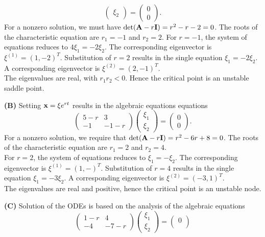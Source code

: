 \documentclass[11pt,a4paper]{article}
\begin{document}
\begin{enumerate}
$$\begin{pmatrix}
			\xi_2
		\end{pmatrix} = 
		\begin{pmatrix}
			0\\
			0
		\end{pmatrix}.
		$$
		For a nonzero solution, we must have $\det(\vb{A} - r\vb{I}) = r^2 - r - 2 = 0$. The roots of the characteristic equation are $r_1 = -1$ and $r_2 = 2$. For $r = -1$, the system of equations reduces to $4\xi_1 = -2\xi_2$. The corresponding eigenvector is $\xi^{(1)} = (1, -2)^T$. Substitution of $r = 2$ results in the single equation $\xi_1 = −2\xi_2$. A corresponding eigenvector is $\xi^{(2)} = (2, -1)^T$.\\
		The eigenvalues are real, with $r_1r_2 < 0$. Hence the critical point is an unstable saddle point.\par
		\textbf{(B)} Setting $\vb{x} = \xi e^{rt}$ results in the algebraic equations equations
		$$
		\begin{pmatrix}
			5-r & 3\\
			-1 & -1-r
		\end{pmatrix}
		\begin{pmatrix}
			\xi_1\\
			\xi_2
		\end{pmatrix} =
		\begin{pmatrix}
			0\\
			0
		\end{pmatrix}.
		$$
		For a nonzero solution, we require that $\det(\vb{A} - r\vb{I}) = r^2 - 6r + 8 = 0$. The roots of the characteristic equation are $r_1 = 2$ and $r_2 = 4$.\\
		For $r = 2$, the system of equations reduces to $\xi_1 = -\xi_2$. The corresponding eigenvector is $\xi^{(1)} = (1, -)^T$. Substitution of $r = 4$ results in the single equation $\xi_1 = -3\xi_2$. A corresponding eigenvector is $\xi^{(2)} = (-3, 1)^T$.\\
		The eigenvalues are real and positive, hence the critical point is an unstable node.\par
		\textbf{(C)} Solution of the ODEs is based on the analysis of the algebraic equations
		$$
		\begin{pmatrix}
			1-r & 4\\
			-4 & -7-r
		\end{pmatrix}
		\begin{pmatrix}
			\xi_1\\
			\xi_2
		\end{pmatrix} =
		\begin{pmatrix}
			0\\

\end{pmatrix}$$
\end{enumerate}
\end{document}
